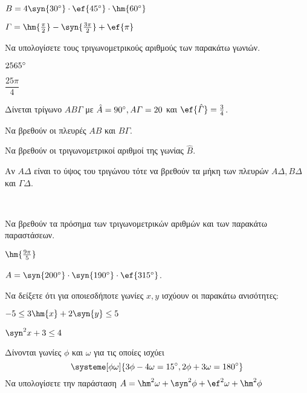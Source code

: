\documentclass[twoside,nofonts,ektypwsh]{frontisthrio-diag}
\begin{document}
\begin{thema}
\begin{erwthma}
\begin{alist}
\item $ B=4\syn{30\degree}\cdot\ef{45\degree}\cdot\hm{60\degree} $
\item $ \varGamma=\hm{\frac{\pi}{2}}-\syn{\frac{3\pi}{2}}+\ef{\pi} $
\end{alist}
\item Να υπολογίσετε τους τριγωνομετρικούς αριθμούς των παρακάτω γωνιών.
\begin{multicols}{2}
\begin{alist}
\item $ 2565\degree $
\item $ \dfrac{25\pi}{4} $
\end{alist}
\end{multicols}
\end{erwthma}
\item Δίνεται τρίγωνο $ AB\varGamma $ με $ \hat{A}=90\degree, A\varGamma=20 $ και $ \ef{\hat{\varGamma}}=\frac{3}{4} $.
\begin{erwthma}
\item Να βρεθούν οι πλευρές $ AB $ και $ B\varGamma $.
\item Να βρεθούν οι τριγωνομετρικοί αριθμοί της γωνίας $ \hat{B} $.
\item Αν $ A\varDelta $ είναι το ύψος του τριγώνου τότε να βρεθούν τα μήκη των πλευρών $ A\varDelta,B\varDelta $ και $ \varGamma\varDelta $.
\end{erwthma}
\item\mbox{}\\\vspace{-7mm}
\begin{erwthma}
\item Να βρεθούν τα πρόσημα των τριγωνομετρικών αριθμών και των παρακάτω παραστάσεων.
\begin{alist}
\item $ \hm{\frac{9\pi}{5}} $
\item $ A=\syn{200\degree}\cdot\syn{190\degree}\cdot\ef{315\degree} $.
\end{alist}
\item Να δείξετε ότι για οποιεσδήποτε γωνίες $ x,y $ ισχύουν οι παρακάτω ανισότητες:
\begin{alist}
\item $ -5\leq 3\hm{x}+2\syn{y}\leq 5 $
\item $ \syn^2{x}+3\leq 4 $
\end{alist}
\item Δίνονται γωνίες $ \phi $ και $ \omega $ για τις οποίες ισχύει
\[ \systeme[\phi\omega]{3\phi-4\omega=15\degree,2\phi+3\omega=180\degree} \]
Να υπολογίσετε την παράσταση $ A=\hm^2{\omega}+\syn^2{\phi}+\ef^2{\omega}+\hm^2{\phi} $
\end{erwthma}
\end{thema}
\end{document}
